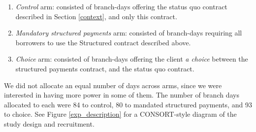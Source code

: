\documentclass[12pt, a4paper, colorinlistoftodos]{article}
\begin{document}
\begin{enumerate}
    \item \textit{Control} arm: consisted of branch-days offering the status quo contract described in Section \ref{context}, and only this contract. 
    \item \textit{Mandatory structured payments} arm: consisted of branch-days requiring all borrowers to use the Structured contract described above.  
    \item \textit{Choice} arm: consisted of branch-days offering the client \textit{a choice} between the structured payments contract, and the status quo contract.
\end{enumerate}

We did not allocate an equal number of days across arms, since we were interested in having more power in some of them. The number of branch days allocated to each were 84 to control, 80 to mandated structured payments, and 93 to choice. See Figure \ref{exp_description} for a CONSORT-style diagram of the study design and recruitment.

\vspace{.2in}
\end{document}
